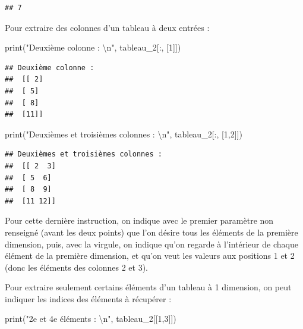 \documentclass[12pt,]{book}
\newenvironment{Shaded}{\begin{snugshade}}{\end{snugshade}}
\newcommand{\DecValTok}[1]{\textcolor[rgb]{0.00,0.00,0.81}{#1}}
\newcommand{\CharTok}[1]{\textcolor[rgb]{0.31,0.60,0.02}{#1}}
\newcommand{\StringTok}[1]{\textcolor[rgb]{0.31,0.60,0.02}{#1}}
\newcommand{\BuiltInTok}[1]{#1}
\newcommand{\NormalTok}[1]{#1}
\numberwithin{equation}{section}
\numberwithin{countremarque}{section}
\begin{document}
\begin{lstlisting}
## 7
\end{lstlisting}

Pour extraire des colonnes d'un tableau à deux entrées :

\begin{Shaded}
\begin{Highlighting}[]
\BuiltInTok{print}\NormalTok{(}\StringTok{"Deuxième colonne : }\CharTok{\textbackslash{}n}\StringTok{"}\NormalTok{, tableau_2[:, [}\DecValTok{1}\NormalTok{]])}
\end{Highlighting}
\end{Shaded}

\begin{lstlisting}
## Deuxième colonne : 
##  [[ 2]
##  [ 5]
##  [ 8]
##  [11]]
\end{lstlisting}

\begin{Shaded}
\begin{Highlighting}[]
\BuiltInTok{print}\NormalTok{(}\StringTok{"Deuxièmes et troisièmes colonnes : }\CharTok{\textbackslash{}n}\StringTok{"}\NormalTok{, tableau_2[:, [}\DecValTok{1}\NormalTok{,}\DecValTok{2}\NormalTok{]])}
\end{Highlighting}
\end{Shaded}

\begin{lstlisting}
## Deuxièmes et troisièmes colonnes : 
##  [[ 2  3]
##  [ 5  6]
##  [ 8  9]
##  [11 12]]
\end{lstlisting}

Pour cette dernière instruction, on indique avec le premier paramètre
non renseigné (avant les deux points) que l'on désire tous les éléments
de la première dimension, puis, avec la virgule, on indique qu'on
regarde à l'intérieur de chaque élément de la première dimension, et
qu'on veut les valeurs aux positions 1 et 2 (donc les éléments des
colonnes 2 et 3).

Pour extraire seulement certains éléments d'un tableau à 1 dimension, on
peut indiquer les indices des éléments à récupérer :

\begin{Shaded}
\begin{Highlighting}[]
\BuiltInTok{print}\NormalTok{(}\StringTok{"2e et 4e éléments : }\CharTok{\textbackslash{}n}\StringTok{"}\NormalTok{, tableau_2[[}\DecValTok{1}\NormalTok{,}\DecValTok{3}\NormalTok{]])}
\end{Highlighting}
\end{Shaded}
\end{document}
